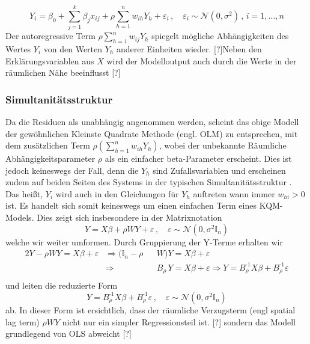 \begin{equation} \label{eq-6.9:slm-mod}
    Y_i = \beta_{0} + \sum_{j=1}^{k} 
    \beta_{j} x_{ij} + \rho \sum_{h=1}^{n} w_{ih}Y_{h} + \varepsilon_{i} \, , \quad
    \varepsilon_{i} \sim \mathcal{N}(0,\sigma^{2}) \, , \, i=1,\ldots,n
\end{equation}
Der autoregressive Term $\rho \sum_{h=1}^{n} w_{ij} Y_{h}$ spiegelt mögliche 
Abhängigkeiten des Wertes $Y_{i}$ von den Werten $Y_{h}$ anderer Einheiten wieder.
[?]Neben den Erklärungsvariablen aus $X$ wird der Modelloutput auch durch die
Werte in der räumlichen Nähe beeinflusst [?]

\subsubsection{Simultanitätsstruktur}

Da die Residuen als unabhängig angenommen werden, scheint das obige Modell der 
gewöhnlichen Kleinste Quadrate Methode (engl. OLM) zu entsprechen, mit dem zusätzlichen 
Term $\rho (\sum_{h=1}^{n} w_{ih} Y_{h})$, wobei der unbekannte Räumliche Abhängigkeitsparameter $\rho$ 
als ein einfacher beta-Parameter erscheint. Dies ist jedoch keineswegs der Fall, denn die $Y_{h}$ sind
Zufallsvariablen und erscheinen zudem auf beiden Seiten des Systems in der typischen \glqq Simultanitätsstruktur \grqq.
Das heißt, $Y_{i}$ wird auch in den Gleichungen für $Y_{h}$ auftreten wann immer $w_{hi}>0$ ist. Es handelt 
sich somit keineswegs um einen einfachen Term eines KQM-Models. Dies zeigt sich insbesondere in der 
Matrixnotation
\begin{equation*}
    Y=X \beta +\rho W Y + \varepsilon \, , \quad 
    \varepsilon \sim \mathcal{N}(0,\sigma^{2} \mathds{I}_{n})
\end{equation*}
welche wir weiter umformen.
Durch Gruppierung der Y-Terme erhalten wir
\begin{alignat*}{2}
    Y - \rho W Y = X \beta + \varepsilon & \Rightarrow (\mathds{I}_{n}-\rho && W)Y =X \beta+\varepsilon \\
                                    & \Rightarrow && B_{\rho} \, Y = X \beta + \varepsilon  \Rightarrow Y= B_{\rho}^{\text{-1}} X \beta + B_{\rho}^{\text{-1}} \varepsilon \\
\end{alignat*}
und leiten die reduzierte Form
\begin{equation} \label{eq-6.10:slm-mod-red}
    Y=B_{\rho}^{\text{-1}} X \beta + B_{\rho}^{\text{-1}} \varepsilon \, , \quad 
    \varepsilon \sim \mathcal{N}(0,\sigma^{2} \mathds{I}_{n})
\end{equation}
ab. In dieser Form ist ersichtlich, dass der räumliche Verzugsterm (engl spatial lag term) $\rho W Y$ 
nicht nur ein simpler Regressionsteil ist. [?] sondern das Modell grundlegend von OLS abweicht [?]

